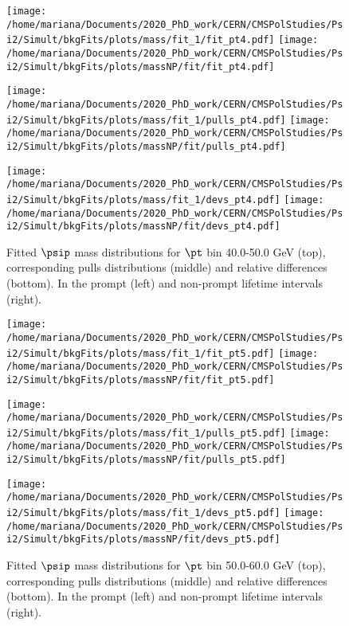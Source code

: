 \pagebreak

\begin{figure}[h!]
\centering
\texttt{[image: /home/mariana/Documents/2020\_PhD\_work/CERN/CMSPolStudies/Psi2/Simult/bkgFits/plots/mass/fit\_1/fit\_pt4.pdf]}
\texttt{[image: /home/mariana/Documents/2020\_PhD\_work/CERN/CMSPolStudies/Psi2/Simult/bkgFits/plots/massNP/fit/fit\_pt4.pdf]}

\texttt{[image: /home/mariana/Documents/2020\_PhD\_work/CERN/CMSPolStudies/Psi2/Simult/bkgFits/plots/mass/fit\_1/pulls\_pt4.pdf]}
\texttt{[image: /home/mariana/Documents/2020\_PhD\_work/CERN/CMSPolStudies/Psi2/Simult/bkgFits/plots/massNP/fit/pulls\_pt4.pdf]}

\texttt{[image: /home/mariana/Documents/2020\_PhD\_work/CERN/CMSPolStudies/Psi2/Simult/bkgFits/plots/mass/fit\_1/devs\_pt4.pdf]}
\texttt{[image: /home/mariana/Documents/2020\_PhD\_work/CERN/CMSPolStudies/Psi2/Simult/bkgFits/plots/massNP/fit/devs\_pt4.pdf]}
\caption{Fitted $\psip$ mass distributions for $\pt$ bin 40.0-50.0 GeV (top), corresponding pulls distributions (middle) and relative differences (bottom). In the prompt (left) and non-prompt lifetime intervals (right).}\label{f:m_fit_4}
\end{figure}

\pagebreak

\begin{figure}[h!]
\centering
\texttt{[image: /home/mariana/Documents/2020\_PhD\_work/CERN/CMSPolStudies/Psi2/Simult/bkgFits/plots/mass/fit\_1/fit\_pt5.pdf]}
\texttt{[image: /home/mariana/Documents/2020\_PhD\_work/CERN/CMSPolStudies/Psi2/Simult/bkgFits/plots/massNP/fit/fit\_pt5.pdf]}

\texttt{[image: /home/mariana/Documents/2020\_PhD\_work/CERN/CMSPolStudies/Psi2/Simult/bkgFits/plots/mass/fit\_1/pulls\_pt5.pdf]}
\texttt{[image: /home/mariana/Documents/2020\_PhD\_work/CERN/CMSPolStudies/Psi2/Simult/bkgFits/plots/massNP/fit/pulls\_pt5.pdf]}

\texttt{[image: /home/mariana/Documents/2020\_PhD\_work/CERN/CMSPolStudies/Psi2/Simult/bkgFits/plots/mass/fit\_1/devs\_pt5.pdf]}
\texttt{[image: /home/mariana/Documents/2020\_PhD\_work/CERN/CMSPolStudies/Psi2/Simult/bkgFits/plots/massNP/fit/devs\_pt5.pdf]}
\caption{Fitted $\psip$ mass distributions for $\pt$ bin 50.0-60.0 GeV (top), corresponding pulls distributions (middle) and relative differences (bottom). In the prompt (left) and non-prompt lifetime intervals (right).}\label{f:m_fit_5}
\end{figure}

